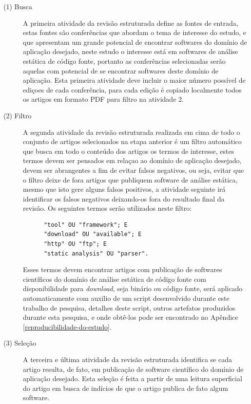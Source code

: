 \begin{description}

  \item[(1) Busca]
    A primeira atividade da revisão estruturada define as fontes de entrada,
    estas fontes são conferências que abordam o tema de interesse do estudo, e
    que apresentam um grande potencial de encontrar softwares do domínio de
    aplicação desejado, neste estudo o interesse está em softwares de análise
    estática de código fonte, portanto as conferências selecionadas serão
    aquelas com potencial de se encontrar softwares deste domínio de aplicação.
    Esta primeira atividade deve incluir o maior número possível de ediçoes de
    cada conferência, para cada edição é copiado localmente todos os artigos em
    formato PDF para filtro na atividade 2.

  \item[(2) Filtro]
    A segunda atividade da revisão estruturada realizada em cima de todo o
    conjunto de artigos selecionados na etapa anterior é um filtro automático
    que busca em todo o conteúdo dos artigos os termos de interesse, estes
    termos devem ser pensados em relaçao ao domínio de aplicação desejado,
    devem ser abrangentes a fim de evitar falsos negativos, ou seja, evitar que
    o filtro deixe de fora artigos que publiquem software de análise estática,
    mesmo que isto gere alguns falsos positivos, a atividade seguinte irá
    identificar os falsos negativos deixando-os fora do resultado final da
    revisão. Os seguintes termos serão utilizados neste filtro:

    \begin{verbatim}
      "tool" OU "framework"; E
      "download" OU "available"; E
      "http" OU "ftp"; E
      "static analysis" OU "parser".
    \end{verbatim}

    Esses termos devem encontrar artigos com publicação de softwares
    científicos do domínio de análise estática de código fonte com
    disponibilidade para {\it download}, seja binário ou código fonte, será
    aplicado automaticamente com auxílio de um script desenvolvido durante este
    trabalho de pesquisa, detalhes deste script, outros artefatos produzidos durante esta
    pesquisa, e onde obtê-los pode ser encontrado no Apêndice \ref{reproducibilidade-do-estudo}.

  \item[(3) Seleção]
    A terceira e última atividade da revisão estruturada identifica se cada
    artigo resulta, de fato, em publicação de software científico do domínio de
    aplicação desejado. Esta seleção é feita a partir de uma leitura
    superficial do artigo em busca de indícios de que o artigo publica de fato
    algum software.


\end{description}
